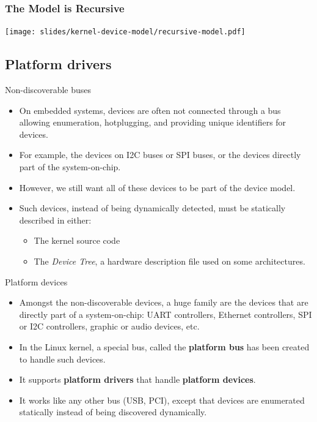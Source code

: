 \begin{frame}
  \frametitle{The Model is Recursive}
  \begin{center}
    \texttt{[image: slides/kernel-device-model/recursive-model.pdf]}
  \end{center}
\end{frame}

\subsection{Platform drivers}

\begin{frame}{Non-discoverable buses}
  \begin{itemize}
  \item On embedded systems, devices are often not connected through a
    bus allowing enumeration, hotplugging, and providing unique
    identifiers for devices.
  \item For example, the devices on I2C buses or SPI buses, or the
    devices directly part of the system-on-chip.
  \item However, we still want all of these devices to be part of the
    device model.
  \item Such devices, instead of being dynamically detected, must be
    statically described in either:
    \begin{itemize}
    \item The kernel source code
    \item The {\em Device Tree}, a hardware description file used on
      some architectures.
    \end{itemize}
  \end{itemize}
\end{frame}

\begin{frame}{Platform devices}
  \begin{itemize}
  \item Amongst the non-discoverable devices, a huge family are the
    devices that are directly part of a system-on-chip: UART
    controllers, Ethernet controllers, SPI or I2C controllers, graphic
    or audio devices, etc.
  \item In the Linux kernel, a special bus, called the {\bf platform
      bus} has been created to handle such devices.
  \item It supports {\bf platform drivers} that handle {\bf platform
      devices}.
  \item It works like any other bus (USB, PCI), except that devices
    are enumerated statically instead of being discovered dynamically.
  \end{itemize}
\end{frame}

